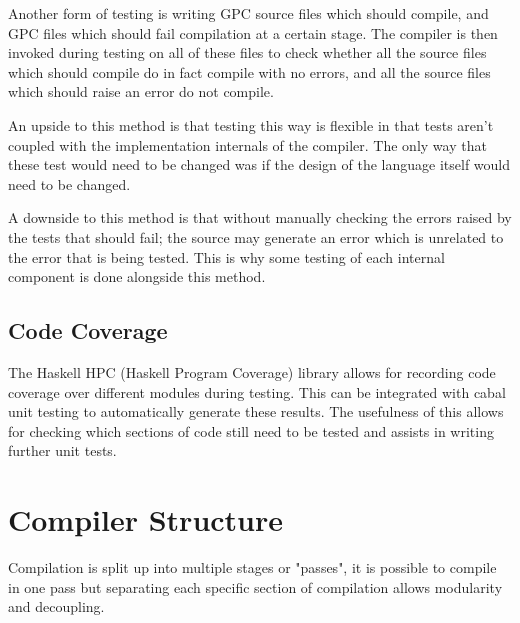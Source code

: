 Another form of testing is writing GPC source files which should compile, and
GPC files which should fail compilation at a certain stage. The compiler
is then invoked during testing on all of these files to check whether
all the source files which should compile do in fact compile with no errors,
and all the source files which should raise an error do not compile.

An upside to this method is that testing this way is flexible in that
tests aren't coupled with the implementation internals of the compiler.
The only way that these test would need to be changed was if the design
of the language itself would need to be changed.

A downside to this method is that without manually checking the errors raised
by the tests that should fail; the source may generate an error which is unrelated
to the error that is being tested. This is why some testing of each internal
component is done alongside this method.

\subsection{Code Coverage}

The Haskell HPC\cite{hpc} (Haskell Program Coverage) library allows for recording
code coverage over different modules during testing. This can be integrated with
cabal unit testing to automatically generate these results. The usefulness of this
allows for checking which sections of code still need to be tested and assists
in writing further unit tests.


\section{Compiler Structure}
Compilation is split up into multiple stages or "passes",
it is possible to compile in one pass but separating each 
specific section of compilation allows modularity and decoupling.

